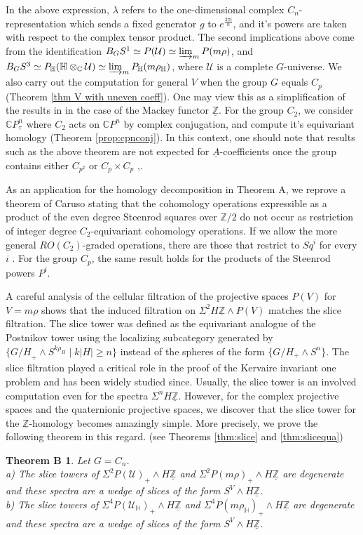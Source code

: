 \documentclass[a4paper,leqno,11pt]{amsart}
\theoremstyle{plain}
\newtheorem*{thmb}{Theorem B}
\theoremstyle{definition}
\theoremstyle{remark}
\theoremstyle{definition}
\newcommand{\C}{{\mathbb C}}
\newcommand{\Hyp}{{\mathbb H}}
\newcommand{\Z}{{\mathbb{Z}}}
\newcommand\UU{{\mathcal U}}
\newcommand{\uA}{\underline{A}}
\newcommand{\uZ}{\underline{\mathbb{Z}}}
\def\Z{\mathbb{Z}}
\def\C{\mathbb{C}}
\numberwithin{equation}{section}
\newcommand{\smas}{\wedge}
\newcommand{\bH}{{\mathbb H}}
\begin{document}
In the above expression, $\lambda$ refers to the one-dimensional complex $C_n$-representation which sends a fixed generator $g$ to  $e^{\frac{2\pi i}{n}}$, and it's powers are taken with respect to the complex tensor product. The second implications above come from the identification $B_GS^1 \simeq P(\UU) \simeq \varinjlim_m P(m\rho)$, and $B_GS^3 \simeq P_\Hyp(\Hyp\otimes_\C \UU) \simeq \varinjlim_m P_\Hyp(m\rho_\Hyp)$, where $\UU$ is a complete $G$-universe. We also carry out the computation for general $V$ when the group $G$ equals $C_p$ (Theorem \ref{thm V with uneven coeff}). One may view this as a simplification of the results in \cite{Lewis} in the case of the Mackey functor $\uZ$. For the group $C_2$, we consider $\C P^n_\tau$ where $C_2$ acts on $\C P^n$ by complex conjugation, and compute it's equivariant homology (Theorem \ref{prop:cpnconj}). In this context, one should note that results such as the above theorem are not expected for $\uA$-coefficients once the group contains either $C_{p^2}$ or $C_p\times C_p$ \cite[Remark 2.2]{Lew92},\cite{FL04}. 

As an application for the homology decomposition in Theorem A, we reprove a theorem of Caruso \cite{Caruso} stating that the cohomology operations expressible as a product of the even degree Steenrod squares  over $\Z/2$ do not occur as restriction of integer degree $C_2$-equivariant cohomology  operations. If we allow the more general $RO(C_2)$-graded operations, there are those that restrict to $Sq^i$ for every $i$ \cite{Voe03}. For the group $C_p$, the same result holds for the products of the Steenrod powers $P^i$. 

A careful analysis of the cellular filtration of the projective spaces $P(V)$ for $V=m\rho$ shows that the induced filtration on $\Sigma^2 H\uZ \wedge P(V)$ matches the slice filtration. The slice tower was defined  as the equivariant analogue of the Postnikov tower using the localizing subcategory generated by $\{{G/H}_+\wedge S^{k\rho_H} \mid k|H|\geq n\}$ instead of the spheres of the form $\{G/H_+\wedge S^n\}$. The slice filtration played a critical role in the proof of the Kervaire invariant one problem \cite{HHR} and has been widely studied since. Usually, the slice tower is an involved computation even for the spectra $\Sigma^n H\uZ$. However, for the complex projective spaces and the quaternionic projective spaces, we discover that the slice tower for the $\uZ$-homology becomes amazingly simple. More precisely, we prove the following theorem in this regard. (see Theorems \ref{thm:slice} and \ref{thm:slicequa})
\begin{thmb} Let $G=C_n$. \\
a) The slice towers of $ \Sigma^2 P(\mathcal{U})_+\smas H\uZ $ and $ \Sigma^2 P(m\rho)_+\smas H\uZ $ are degenerate and these spectra are a wedge of slices of the form $ S^V\smas H\uZ $. \\
b) The slice towers of $ \Sigma^4 P(\mathcal{U}_\bH)_+\smas H\uZ $ and $ \Sigma^4 P(m\rho_\bH)_+\smas H\uZ $ are degenerate and these spectra are a wedge of slices of the form $ S^V\smas H\uZ $.
\end{thmb}
\end{document}
